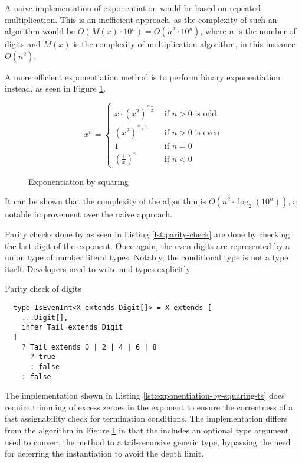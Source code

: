 A naive implementation of exponentiation would be based on repeated multiplication. This is an inefficient approach, as the complexity of such an algorithm would be $O(M(x) \cdot 10^n) = O(n^2 \cdot 10^n)$, where $n$ is the number of digits and $M(x)$ is the complexity of multiplication algorithm, in this instance $O(n^2)$.

A more efficient exponentiation method is to perform binary exponentiation instead, as seen in Figure \ref{fig:exponentiation-by-squaring}.

\begin{figure}[ht]
  \begin{equation*}
    x^n =
    \begin{cases}
      x \cdot (x^2)^\frac{n-1}{2} & \text{if } n > 0 \text{ is odd}  \\
      (x^2)^\frac{n-1}{2}         & \text{if } n > 0 \text{ is even} \\
      1                           & \text{if } n = 0                 \\
      (\frac{1}{x})^n             & \text{if } n < 0
    \end{cases}
  \end{equation*}
  \caption{Exponentiation by squaring}\label{fig:exponentiation-by-squaring}
\end{figure}

It can be shown that the complexity of the algorithm is $O(n^2 \cdot \log_2(10^n))$, a notable improvement over the naive approach.

Parity checks done by  as seen in Listing \ref{lst:parity-check} are done by checking the last digit of the exponent. Once again, the even digits are represented by a union type of number literal types. Notably, the conditional type is not a type itself. Developers need to write  and  types explicitly.

\begin{listing}[ht]
  \caption{Parity check of digits}\label{lst:parity-check}
  \begin{verbatim}
  type IsEvenInt<X extends Digit[]> = X extends [
    ...Digit[],
    infer Tail extends Digit
  ]
    ? Tail extends 0 | 2 | 4 | 6 | 8
      ? true
      : false
    : false
  \end{verbatim}
\end{listing}

The implementation shown in Listing \ref{lst:exponentiation-by-squaring-ts} does require trimming of excess zeroes in the exponent to ensure the correctness of a fast assignability check for termination conditions. The implementation differs from the algorithm in Figure \ref{fig:exponentiation-by-squaring} in that the  includes an optional type argument  used to convert the method to a tail-recursive generic type, bypassing the need for deferring the instantiation to avoid the depth limit.

